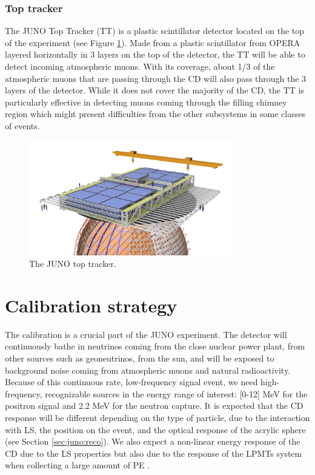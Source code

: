 \documentclass[../main.tex]{subfiles}
\begin{document}
\subsubsection{Top tracker}
The JUNO Top Tracker (TT) is a plastic scintillator detector located on the top of the experiment (see Figure \ref{fig:juno:tt}). Made from a plastic scintillator from OPERA \cite{acquafredda_opera_2009} layered horizontally in 3 layers on the top of the detector, the TT will be able to detect incoming atmospheric muons.
With its coverage, about 1/3 of the atmospheric muons that are passing through the CD will also pass through the 3 layers of the detector. While it does not cover the majority of the CD, the TT is particularly effective in detecting muons coming through the filling chimney region which might present difficulties from the other subsystems in some classes of events.
\begin{figure}[ht]
  \centering
  \includegraphics[height=5cm]{images/juno/Global_TT_01.png}
  \caption{The JUNO top tracker.}
  \label{fig:juno:tt}
\end{figure}

\section{Calibration strategy}
\label{sec:juno:calib}

The calibration is a crucial part of the JUNO experiment. The detector will continuously bathe in neutrinos coming from the close nuclear power plant, from other sources such as geoneutrinos, from the sun, and will be exposed to background noise coming from atmospheric muons and natural radioactivity.
Because of this continuous rate, low-frequency signal event, we need high-frequency, recognizable sources in the energy range of interest: [0-12] MeV for the positron signal and 2.2 MeV for the neutron capture.
It is expected that the CD response will be different depending on the type of particle, due to the interaction with LS, the position on the event, and the optical response of the acrylic sphere (see Section \ref{sec:juno:reco}).
We also expect a non-linear energy response of the CD due to the LS properties \cite{bay_optimization_2020} but also due to the response of the LPMTs system when collecting a large amount of PE \cite{han_dual_2021}.
\end{document}
